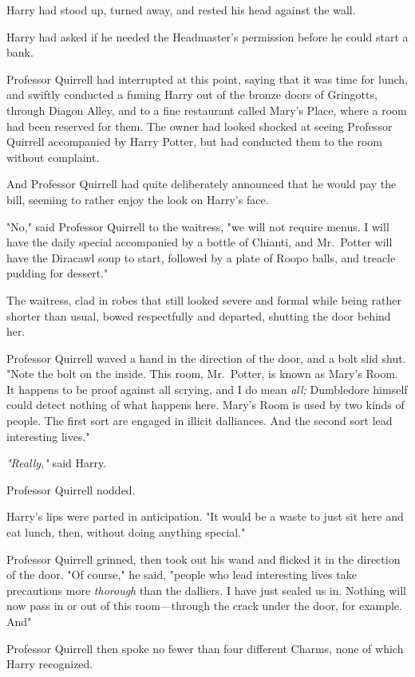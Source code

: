 Harry had stood up, turned away, and rested his head against the wall.

Harry had asked if he needed the Headmaster's permission before he could start
a bank.

Professor Quirrell had interrupted at this point, saying that it was time for
lunch, and swiftly conducted a fuming Harry out of the bronze doors of
Gringotts, through Diagon Alley, and to a fine restaurant called Mary's Place,
where a room had been reserved for them. The owner had looked shocked at seeing
Professor Quirrell accompanied by Harry Potter, but had conducted them to the
room without complaint.

And Professor Quirrell had quite deliberately announced that he would pay the
bill, seeming to rather enjoy the look on Harry's face.

"No," said Professor Quirrell to the waitress, "we will not require menus. I
will have the daily special accompanied by a bottle of Chianti, and Mr.~Potter
will have the Diracawl soup to start, followed by a plate of Roopo balls, and
treacle pudding for dessert."

The waitress, clad in robes that still looked severe and formal while being
rather shorter than usual, bowed respectfully and departed, shutting the door
behind her.

Professor Quirrell waved a hand in the direction of the door, and a bolt slid
shut. "Note the bolt on the inside. This room, Mr.~Potter, is known as Mary's
Room. It happens to be proof against all scrying, and I do mean \emph{all;}
Dumbledore himself could detect nothing of what happens here. Mary's Room is
used by two kinds of people. The first sort are engaged in illicit dalliances.
And the second sort lead interesting lives."

\emph{"Really,"} said Harry.

Professor Quirrell nodded.

Harry's lips were parted in anticipation. "It would be a waste to just sit here
and eat lunch, then, without doing anything special."

Professor Quirrell grinned, then took out his wand and flicked it in the
direction of the door. "Of course," he said, "people who lead interesting lives
take precautions more \emph{thorough} than the dalliers. I have just sealed us
in. Nothing will now pass in or out of this room---through the crack under the
door, for example. And{\el}"

Professor Quirrell then spoke no fewer than four different Charms, none of
which Harry recognized.

